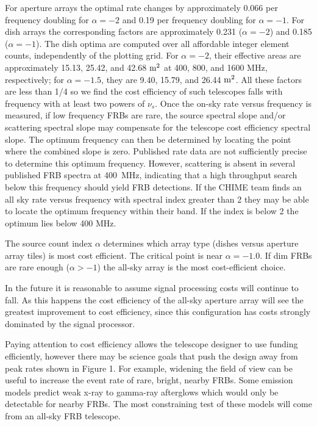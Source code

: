 \documentclass[fleqn,usenatbib]{mnras}
\begin{document}
For aperture arrays the optimal rate changes by approximately 0.066 per frequency doubling for $\alpha =-2$ and 0.19 per frequency doubling for $\alpha =-1$. For dish arrays the corresponding factors are approximately 0.231 ($\alpha=-2$) and 0.185 ($\alpha=-1$). The dish optima are computed over all affordable integer element counts, independently of the plotting grid. For $\alpha=-2$, their effective areas are approximately 15.13, 25.42, and 42.68 $\rm{m^2}$ at 400, 800, and 1600 MHz, respectively; for $\alpha=-1.5$, they are 9.40, 15.79, and 26.44 $\rm{m^2}$. All these factors are less than 1/4 so we find the cost efficiency of such telescopes falls with frequency with at least two powers of $\nu_s$. Once the on-sky rate versus frequency is measured, if low frequency FRBs are rare, the source spectral slope and/or scattering spectral slope may compensate for the telescope cost efficiency spectral slope. The optimum frequency can then be determined by locating the point where the combined slope is zero. Published rate data are not sufficiently precise to determine this optimum frequency. However, scattering is absent in several published FRB spectra at 400~MHz, indicating that a high throughput search below this frequency should yield FRB detections.
If the CHIME team finds an all sky rate versus frequency with spectral index greater than 2 they may be able to locate the optimum frequency within their band. If the index is below 2 the optimum lies below 400 MHz.

The source count index $\alpha$ determines which array type (dishes versus aperture array tiles) is most cost efficient. The critical point is near $\alpha = -1.0$. If dim FRBs are rare enough ($\alpha > -1$) the all-sky array is the most cost-efficient choice.

In the future it is reasonable to assume signal processing costs will continue to fall. As this happens the cost efficiency of the all-sky aperture array will see the greatest improvement to cost efficiency, since this configuration has costs strongly dominated by the signal processor.

Paying attention to cost efficiency allows the telescope designer to use funding efficiently, however there may be science goals that push the design away from peak rates shown in Figure 1. For example, widening the field of view can be useful to increase the event rate of rare, bright, nearby FRBs.
Some emission models \citep{2019MNRAS.485.4091M} predict weak x-ray to gamma-ray afterglows which would only be detectable for nearby FRBs. The most constraining test of these models will come from an all-sky FRB telescope.
\end{document}
